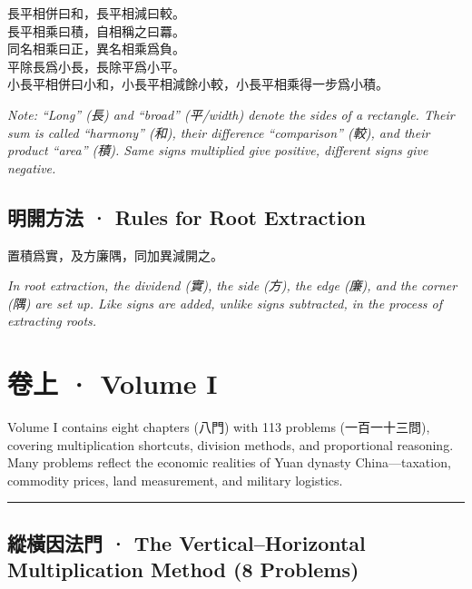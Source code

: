 \documentclass[11pt,a4paper]{article}
\newcommand{\longline}{\noindent\rule{\textwidth}{0.4pt}}
\newcommand{\cnote}[1]{\textcolor{notecolor}{\textit{#1}}}
\begin{document}
\noindent
長平相併曰和，長平相減曰較。\\[2pt]
長平相乘曰積，自相稱之曰羃。\\[2pt]
同名相乘曰正，異名相乘爲負。\\[2pt]
平除長爲小長，長除平爲小平。\\[2pt]
小長平相併曰小和，小長平相減餘小較，小長平相乘得一步爲小積。

\cnote{Note: ``Long'' (長) and ``broad'' (平/width) denote the sides of a rectangle.
Their sum is called ``harmony'' (和), their difference ``comparison'' (較),
and their product ``area'' (積). Same signs multiplied give positive,
different signs give negative.}

\subsection{明開方法 · Rules for Root Extraction}

\noindent
置積爲實，及方廉隅，同加異減開之。

\cnote{In root extraction, the dividend (實), the side (方), the edge (廉), and the
corner (隅) are set up. Like signs are added, unlike signs subtracted, in the
process of extracting roots.}




\newpage
\section{卷上 · Volume I}

Volume I contains eight chapters (八門) with 113 problems (一百一十三問),
covering multiplication shortcuts, division methods, and proportional reasoning.
Many problems reflect the economic realities of Yuan dynasty China---taxation,
commodity prices, land measurement, and military logistics.

\longline

\subsection{縱橫因法門 · The Vertical--Horizontal Multiplication Method (8 Problems)}
\label{sec:zongheng}
\end{document}
